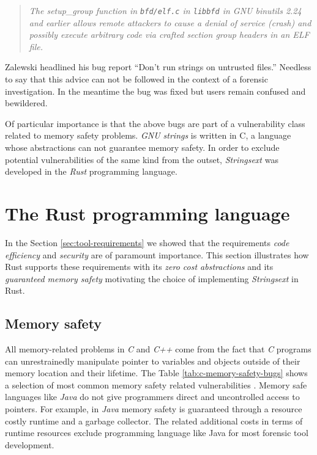 \documentclass[final,5p,times,twocolumn]{elsarticle}
\begin{document}
\begin{quote}
   \emph{The setup\_group function in \texttt{bfd/elf.c} in \texttt{libbfd} in
   GNU binutils 2.24 and earlier allows remote attackers to cause a denial of
   service (crash) and possibly execute arbitrary code via crafted section
   group headers in an ELF file.}
\end{quote}

Zalewski headlined his bug report ``Don't run strings on untrusted
files.'' Needless to say that this advice can not be followed in the
context of a forensic investigation. In the meantime the bug was fixed
but users remain confused and bewildered.

Of particular importance is that the above bugs are part of a vulnerability
class related to memory safety problems. \emph{GNU strings} is written in C, a
language whose abstractions can not guarantee memory safety. In order to exclude
potential vulnerabilities of the same kind from the outset, \emph{Strings­ext}
was developed in the \emph{Rust} programming language.



\section{The Rust programming language}\label{rust}
\label{rust-lang}

In the Section \ref{sec:tool-requirements} we showed that the requirements
\emph{code efficiency} and \emph{security} are of paramount importance. 
This section illustrates how Rust supports these requirements with
its \emph{zero cost abstractions} and its \emph{guaranteed memory safety}
\cite{therustteam2019}
motivating the choice of implementing \emph{Strings­ext} in Rust.
\subsection{Memory safety}\label{_memory_safety}

All memory-related problems in \emph{C} and \emph{C++} come from the
fact that \emph{C} programs can unrestrainedly manipulate pointer to
variables and objects outside of their memory location and their
lifetime. The Table \ref{tab:c-memory-safety-bugs}
shows a selection of most common memory safety related vulnerabilities
\cite{mitrecorporation2016}. Memory
safe languages like \emph{Java} do not give programmers direct and
uncontrolled access to pointers. For example, in \emph{Java} 
memory safety is guaranteed through 
a resource costly runtime and a garbage collector. The related
additional costs in terms of runtime resources exclude programming
language like Java for most forensic tool development.
\end{document}
